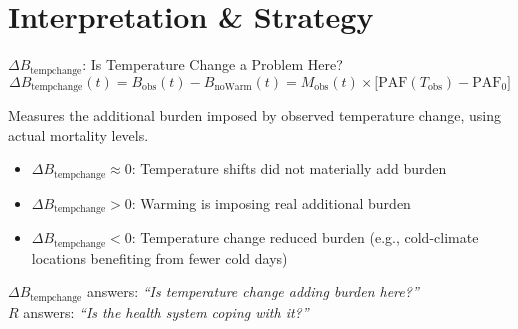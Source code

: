 \documentclass[aspectratio=169,10pt]{beamer}
\begin{document}
\section{Interpretation \& Strategy}

\begin{frame}{$\Delta B_{\text{tempchange}}$: Is Temperature Change a Problem Here?}
      \begin{equation*}
        \Delta B_{\text{tempchange}}(t) = B_{\text{obs}}(t) - B_{\text{noWarm}}(t)
        = M_{\text{obs}}(t) \times \bigl[\text{PAF}(T_{\text{obs}}) - \text{PAF}_0\bigr]
      \end{equation*}

      \vspace{0.3em}
      Measures the \alert{additional burden imposed by observed temperature change}, using actual mortality levels.

      \vspace{0.3em}
      \begin{itemize}
        \item $\Delta B_{\text{tempchange}} \approx 0$: Temperature shifts did not materially add burden
        \item $\Delta B_{\text{tempchange}} > 0$: Warming is imposing real additional burden
        \item $\Delta B_{\text{tempchange}} < 0$: Temperature change reduced burden (e.g., cold-climate locations benefiting from fewer cold days)
      \end{itemize}

      \vspace{0.5em}
      $\Delta B_{\text{tempchange}}$ answers: \emph{``Is temperature change adding burden here?''}\\
      $R$ answers: \emph{``Is the health system coping with it?''}
\end{frame}
\end{document}
